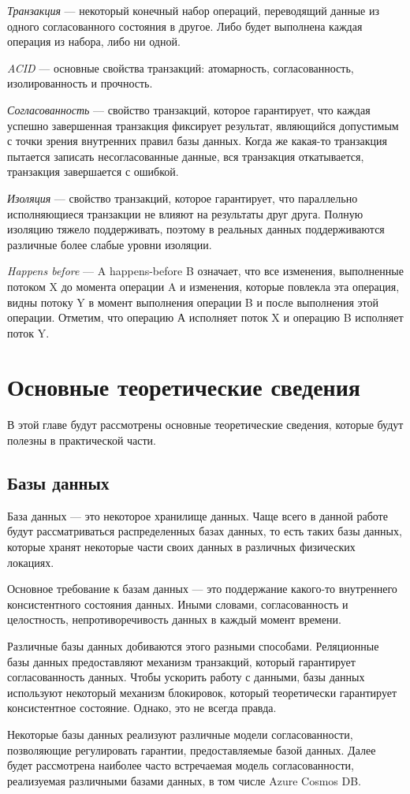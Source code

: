 \documentclass[12pt,  openany]{book}
\begin{document}
\emph{Транзакция} --- некоторый конечный набор операций, переводящий данные из одного согласованного состояния в другое. Либо будет выполнена каждая операция из набора, либо ни одной.

\emph{ACID} --- основные свойства транзакций: атомарность, согласованность, изолированность и прочность.

\emph{Согласованность} --- свойство транзакций, которое гарантирует, что каждая успешно завершенная транзакция фиксирует результат, являющийся допустимым с точки зрения внутренних правил базы данных. Когда же какая-то транзакция пытается записать несогласованные данные, вся транзакция откатывается, транзакция завершается с ошибкой.

\emph{Изоляция} --- свойство транзакций, которое гарантирует, что параллельно исполняющиеся транзакции не влияют на результаты друг друга.  Полную изоляцию тяжело поддерживать, поэтому в реальных данных поддерживаются различные более слабые уровни изоляции.

\emph{Happens before} --- A happens-before B означает, что все изменения, выполненные потоком X до момента операции A и изменения, которые повлекла эта операция, видны потоку Y в момент выполнения операции B и после выполнения этой операции. Отметим, что операцию А исполняет поток X и операцию B исполняет поток Y. \cite{habrMemoryModel}


\chapter{Основные теоретические сведения}
В этой главе будут рассмотрены основные теоретические сведения, которые будут полезны в практической части.
\section{Базы данных}
База данных --- это некоторое хранилище данных.  Чаще всего в данной работе будут рассматриваться распределенных базах данных, то есть таких базы данных,  которые хранят некоторые части своих данных в различных физических локациях.
\par
Основное требование к базам данных --- это поддержание какого-то внутреннего консистентного состояния данных. Иными словами, согласованность и целостность, непротиворечивость данных в каждый момент времени.
\par
Различные базы данных добиваются этого разными способами. Реляционные базы данных предоставляют механизм транзакций, который гарантирует согласованность данных. Чтобы ускорить работу с данными, базы данных используют некоторый механизм блокировок, который теоретически гарантирует консистентное состояние. Однако, это не всегда правда.
\par
Некоторые базы данных реализуют различные модели согласованности, позволяющие регулировать гарантии, предоставляемые базой данных. Далее будет рассмотрена наиболее часто встречаемая модель согласованности, реализуемая различными базами данных, в том числе Azure Cosmos DB.
\end{document}
